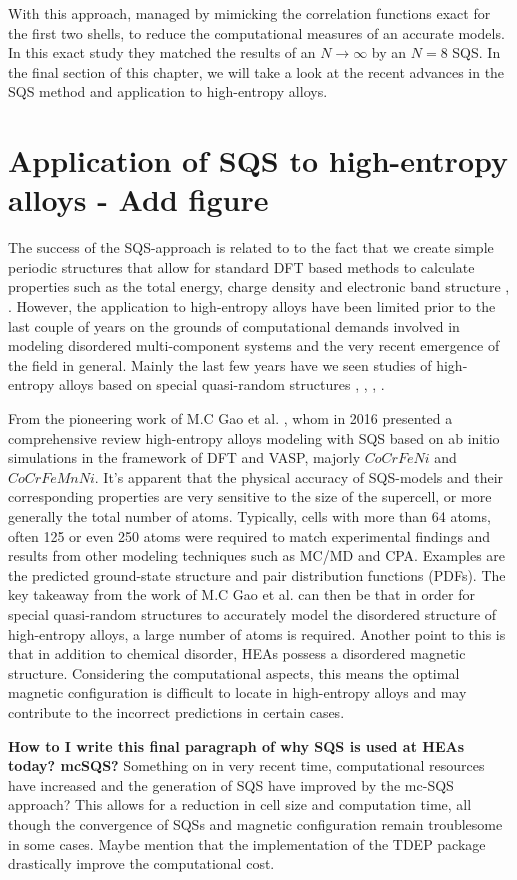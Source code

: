 With this approach, \cite{sqsfull} managed by mimicking the correlation functions exact for the first two shells, to reduce the computational measures of an accurate models. In this exact study they matched the results of an $N \rightarrow \infty$ by an $N=8$ SQS. In the final section of this chapter, we will take a look at the recent advances in the SQS method and application to high-entropy alloys. 

\section{Application of SQS to high-entropy alloys - Add figure}
The success of the SQS-approach is related to to the fact that we create simple periodic structures that allow for standard DFT based methods to calculate properties such as the total energy, charge density and electronic band structure \cite{sqs_dos}, \cite{sqs_bg}. However, the application to high-entropy alloys have been limited prior to the last couple of years on the grounds of computational demands involved in modeling disordered multi-component systems and the very recent emergence of the field in general. Mainly the last few years have we seen studies of high-entropy alloys based on special quasi-random structures \cite{WANG2021128754}, \cite{WEI2021167432}, \cite{RASHID2014285}, \cite{SORKIN2021160776}.   

From the pioneering work of  M.C Gao et al. \cite{hea2016_ch10}, whom in 2016 presented a comprehensive review high-entropy alloys modeling with SQS based on ab initio simulations in the framework of DFT and VASP,  majorly $CoCrFeNi$ and $CoCrFeMnNi$. It's apparent that the physical accuracy of SQS-models and their corresponding properties are very sensitive to the size of the supercell, or more generally the total number of atoms. Typically, cells with more than 64 atoms, often 125 or even 250 atoms were required to match experimental findings and results from other modeling techniques such as MC/MD and CPA. Examples are the predicted ground-state structure and pair distribution functions (PDFs). The key takeaway from the work of M.C Gao et al. can then be that in order for special quasi-random structures to accurately model the disordered structure of high-entropy alloys, a large number of atoms is required. Another point to this is that in addition to chemical disorder, HEAs possess a disordered magnetic structure. Considering the computational aspects, this means the optimal magnetic configuration is difficult to locate in high-entropy alloys and may contribute to the incorrect predictions in certain cases.

\textbf{How to I write this final paragraph of why SQS is used at HEAs today? mcSQS?}
Something on in very recent time, computational resources have increased and the generation of SQS have improved by the mc-SQS approach? This allows for a reduction in cell size and computation time, all though the convergence of SQSs and magnetic configuration remain troublesome in some cases. Maybe mention that the implementation of the TDEP package drastically improve the computational cost.     
